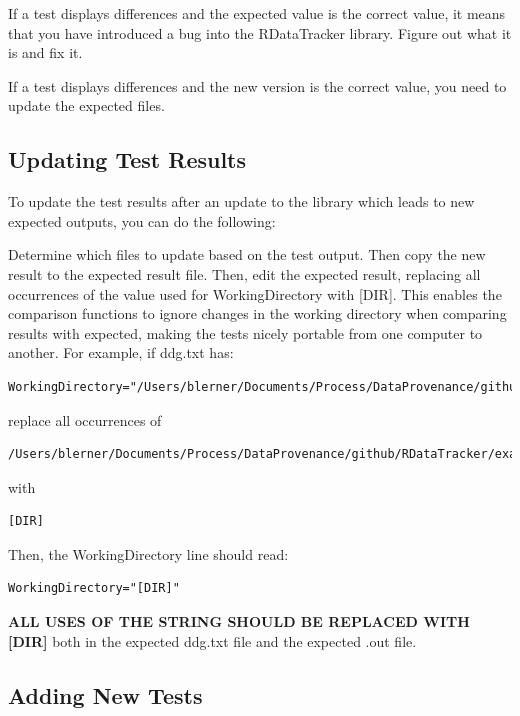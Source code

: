 \documentclass[12pt]{article}
\begin{document}
If a test displays differences and the expected value is the correct value, it 
means that you have introduced a bug into the RDataTracker library.  Figure out
what it is and fix it.

If a test displays differences and the new version is the correct value, you need
to update the expected files. 

\subsection{Updating Test Results}
\label{sec:update_tests}
To update the test results after an update to the library which leads to new expected outputs, you can do the following:

Determine which files to update based on the test output.  Then copy the new result to the expected result file.  Then, edit the expected result, replacing all occurrences of the value used for WorkingDirectory with [DIR].  This enables the comparison functions to ignore changes in the working directory when comparing results with expected, making the tests nicely portable from
one computer to another.  For example, if ddg.txt has:

\begin{lstlisting}
WorkingDirectory="/Users/blerner/Documents/Process/DataProvenance/github/RDataTracker/examples/consoleSource"
\end{lstlisting}  

replace all occurrences of 

\begin{lstlisting}
/Users/blerner/Documents/Process/DataProvenance/github/RDataTracker/examples/consoleSource
\end{lstlisting}

with 

\begin{lstlisting}
[DIR]
\end{lstlisting}


Then, the WorkingDirectory line should read:

\begin{lstlisting}
WorkingDirectory="[DIR]" 
\end{lstlisting}

\textbf{ALL USES OF THE STRING SHOULD BE REPLACED WITH [DIR]} both in the expected 
ddg.txt file and the expected .out file.


\subsection{Adding New Tests}
\label{section:details}
\end{document}
